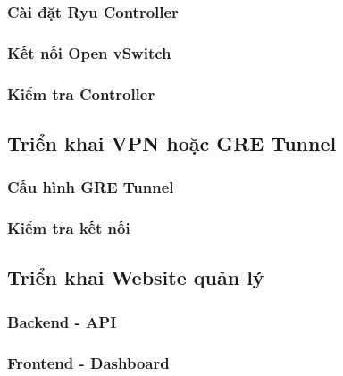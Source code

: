 \subsubsection{Cài đặt Ryu Controller}

\subsubsection{Kết nối Open vSwitch}

\subsubsection{Kiểm tra Controller}

\subsection{Triển khai VPN hoặc GRE Tunnel}

\subsubsection{Cấu hình GRE Tunnel}

\subsubsection{Kiểm tra kết nối}

\subsection{Triển khai Website quản lý}

\subsubsection{Backend - API}

\subsubsection{Frontend - Dashboard}

